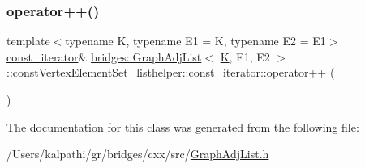 \mbox{\label{classbridges_1_1_graph_adj_list_1_1const_vertex_element_set__listhelper_1_1const__iterator_a3c654115a3c563a3a8b3b4613bddd763}} 
\subsubsection{\texorpdfstring{operator++()}{operator++()}}
{\footnotesize\ttfamily template$<$typename K, typename E1 = K, typename E2 = E1$>$ \\
\mbox{\hyperlink{classbridges_1_1_graph_adj_list_1_1const_vertex_element_set__listhelper_1_1const__iterator}{const\+\_\+iterator}}\& \mbox{\hyperlink{classbridges_1_1_graph_adj_list}{bridges\+::\+Graph\+Adj\+List}}$<$ \mbox{\hyperlink{namespacebridges_acfb0a4f7877d8f63de3e6862004c50edaa5f3c6a11b03839d46af9fb43c97c188}{K}}, E1, E2 $>$\+::const\+Vertex\+Element\+Set\+\_\+listhelper\+::const\+\_\+iterator\+::operator++ (\begin{DoxyParamCaption}{ }\end{DoxyParamCaption})\hspace{0.3cm}{\ttfamily [inline]}}



The documentation for this class was generated from the following file\+:\begin{DoxyCompactItemize}
\item 
/\+Users/kalpathi/gr/bridges/cxx/src/\mbox{\hyperlink{_graph_adj_list_8h}{Graph\+Adj\+List.\+h}}\end{DoxyCompactItemize}

